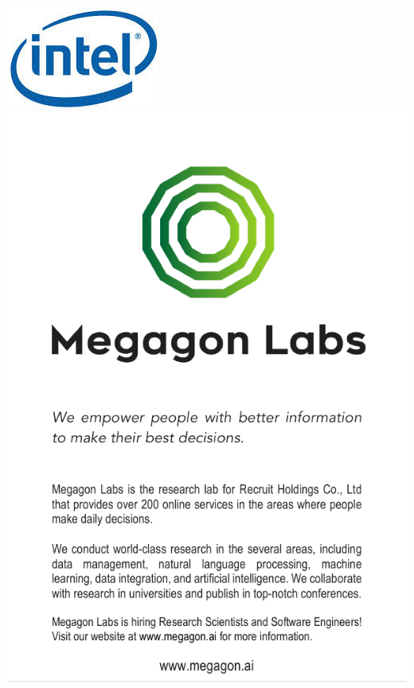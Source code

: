 \includegraphics[height=.49\textheight,width=\textwidth,keepaspectratio]{ads/intel.jpg}
\vfill
\includegraphics[height=.49\textheight,width=\textwidth,keepaspectratio]{ads/megagon-cropped.pdf}
\pagebreak

